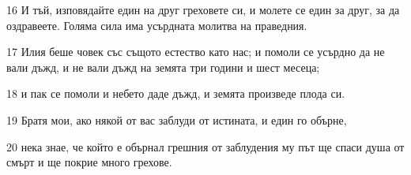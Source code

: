 \par 16 И тъй, изповядайте един на друг греховете си, и молете се един за друг, за да оздравеете. Голяма сила има усърдната молитва на праведния.
\par 17 Илия беше човек със същото естество като нас; и помоли се усърдно да не вали дъжд, и не вали дъжд на земята три години и шест месеца;
\par 18 и пак се помоли и небето даде дъжд, и земята произведе плода си.
\par 19 Братя мои, ако някой от вас заблуди от истината, и един го обърне,
\par 20 нека знае, че който е обърнал грешния от заблудения му път ще спаси душа от смърт и ще покрие много грехове.

